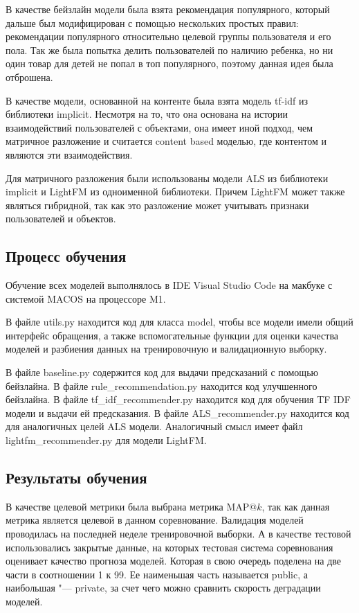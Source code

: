 \documentclass[bachelor, och, coursework]{SCWorks}
\begin{document}
В качестве бейзлайн модели была взята рекомендация популярного, который дальше был модифицирован с помощью нескольких простых правил:
рекомендации популярного относительно целевой группы пользователя и его пола. Так же была попытка делить пользователей по наличию ребенка,
но ни один товар для детей не попал в топ популярного, поэтому данная идея была отброшена.  

В качестве модели, основанной на контенте была взята модель tf-idf из библиотеки implicit. Несмотря на то, что она основана на
истории взаимодействий пользователей с объектами, она имеет иной подход, чем матричное разложение и считается content based моделью,
где контентом и являются эти взаимодействия.

Для матричного разложения были использованы модели ALS из библиотеки implicit и LightFM из одноименной библиотеки.
Причем LightFM может также являться гибридной, так как это разложение может учитывать признаки пользователей и объектов. 

\subsection{Процесс обучения}
Обучение всех моделей выполнялось в IDE Visual Studio Code на макбуке с системой MACOS на процессоре M1. 

В файле utils.py находится код для класса model, чтобы все модели имели общий интерфейс обращения, а также вспомогательные функции для оценки
качества моделей и разбиения данных на тренировочную и валидационную выборку.

В файле baseline.py содержится код для выдачи предсказаний с помощью бейзлайна. В файле rule_recommendation.py находится
код улучшенного бейзлайна. В файле tf_idf_recommender.py находится код для обучения TF IDF модели и выдачи ей предсказания.
В файле ALS_recommender.py находится код для аналогичных целей ALS модели. Аналогичный смысл имеет файл lightfm_recommender.py
для модели LightFM.

\subsection{Результаты обучения}
В качестве целевой метрики была выбрана метрика MAP$@k$, так как данная метрика является целевой в данном соревнование.
Валидация моделей проводилась на последней неделе тренировочной выборки. А в качестве тестовой использовались закрытые данные,
на которых тестовая система соревнования оценивает качество прогноза моделей. Которая в свою очередь поделена на две части в
соотношении 1 к 99. Ее наименьшая часть называется public, а наибольшая "--- private, за счет чего можно сравнить скорость
деградации моделей.
\end{document}
